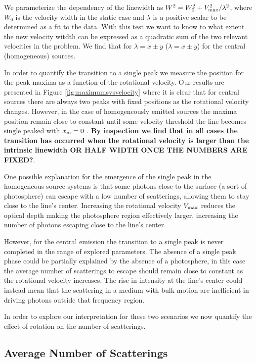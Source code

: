 \documentclass{emulateapj}
\newcommand{\kms}{{\ifmmode{{\mathrm{\,km\ s}^{-1}}}\else{\,km~s$^{-1}$}\fi}}
\begin{document}
We parameterize the dependency of the linewidth as $W^2 =
W_{0}^2 + V_{\rm max}^2/\lambda^2$, where $W_{0}$ is the
velocity width in the static case and $\lambda$ is a positive
scalar to be determined as a fit to the data. With this test we want
to know to what extent the new velocity witdth can be expressed as a
quadratic sum of the two relevant velocities in the problem. We find
that for $\lambda = x\pm y$ ($\lambda=x\pm y$) for the central
(homogeneous) sources.

In order to quantify the transition to a single peak we measure the
position for the peak maxima as a function of the rotational
velocity. Our results are presented in Figure
\ref{fig:maximumsvsvelocity} where it is clear that for central
sources there are always two peaks with fixed positions as the rotational
velocity changes. However, in the case of homogeneously emitted
sources the maxima position remain close to constant until some
velocity threshold the line becomes single peaked with $x_{\rm m}=0$
\kms. {\bf By inspection we find that in all cases the transition has
occurred when the rotational velocity is larger than the intrinsic
linewidth OR HALF WIDTH ONCE THE NUMBERS ARE FIXED?}.

One possible explanation for the emergence of the single peak in the
homogeneous source systems is that some photons close to the surface
(a sort of photosphere) can escape with a low number of scatterings,
allowing them to stay close to the line's center. Increasing the
rotational velocity $V_{\rm max}$ reduces the optical depth making the
photosphere region effectively larger, increasing the number of
photons escaping close to the line's center. 

However, for the central emission the transition to a single peak is
never completed in the range of explored parameters. The absence
of a single peak phase could be partially explained by the absence of a
photosphere, in this case the average number of scatterings to escape
should remain close to constant as the rotational velocity
increases. The rise in intensity at the line's center could instead
mean that the scattering in a medium with bulk motion are inefficient
in driving photons outside that frequency region.

In order to explore our interpretation for these two scenarios we now 
quantify the effect of rotation on the number of scatterings.

\subsection{Average Number of Scatterings}
\end{document}
